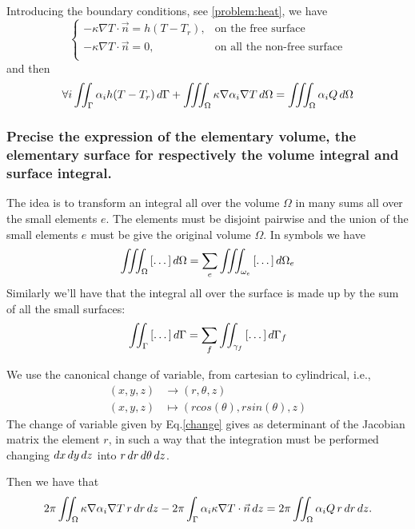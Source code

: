 Introducing the boundary conditions, see \eqref{problem:heat}, we have
\[\begin{cases}
-\kappa\nabla T\cdot \vec{n}=h(T-T_r),& \text{on the free surface}\\
-\kappa\nabla T\cdot \vec{n}=0,&\text{on all the non-free surface}\\
\end{cases}\]
and then 
\begin{equation}
\forall i \iint_{\Gamma}\alpha_i h(T-T_r)\mathop{}\!d\Gamma+\iiint_{\Omega}\kappa\nabla\alpha_i\nabla T\mathop{}\!d\Omega =\iiint_{\Omega}\alpha_i Q\mathop{}\!d\Omega
\end{equation}
\subsubsection{Precise the expression of the elementary volume, the elementary surface for respectively the volume integral and surface integral.}
The idea is to transform an integral all over the volume $ \Omega $ in many sums all over the small elements $ e $. The elements must be disjoint pairwise and the union of the small elements $ e $ must be give the original volume $ \Omega $. In symbols we have
\[\iiint_{\Omega}\left[\dots\right]\mathop{}\!d\Omega=\sum_e\iiint_{\omega_e}\left[\dots\right]\mathop{}\!d\Omega_e \]
Similarly we'll have that the integral all over the surface is made up by the sum of all the small surfaces:
\[\iint_{\Gamma}\left[\dots\right]\mathop{}\!d\Gamma=\sum_f\iint_{\gamma_f}\left[\dots\right]\mathop{}\!d\Gamma_f \] 
	
We use the canonical change of variable, from cartesian to cylindrical, i.e., \begin{align}\label{change}
	(x,y,z)&\to(r,\theta,z)\\
	(x,y,z)&\mapsto(rcos(\theta),rsin(\theta),z)\nonumber
	\end{align}
The change of variable given by Eq.\ref{change} gives as determinant of the Jacobian matrix the element $ r $, in such a way that the integration must be performed changing $ \mathop{}\!d x\mathop{}\!d y\mathop{}\!d z $ into $ r\mathop{}\!d r\mathop{}\!d\theta\mathop{}\!d z $.
	
Then we have that 
\[ 2\pi\iint_{\Omega}\kappa\nabla\alpha_i\nabla T\,r\mathop{}\!d r\mathop{}\!d z-2\pi\int_{\Gamma}\alpha_i\kappa\nabla T\cdot\vec{n}\mathop{}\!d z=2\pi\iint_{\Omega}\alpha_i Q\,r\mathop{}\!d r\mathop{}\!d z. \]
	
